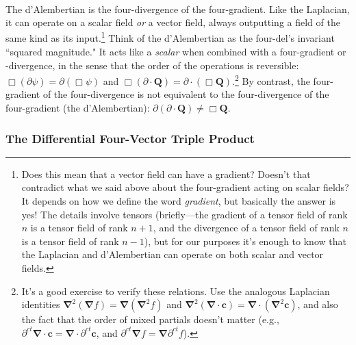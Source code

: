 \documentclass[12pt]{article}
\renewcommand{\vv}[1]{\mathbf{#1}}
\newcommand{\del}{\boldsymbol{\nabla}}
\begin{document}
\begin{itemize}
{\begin{equation*}
\begin{split}
\end{split}
\end{equation*}
The d'Alembertian is the four-divergence of the four-gradient. Like the Laplacian, it can operate on a scalar field \emph{or} a vector field, always outputting a field of the same kind as its input.\footnote{\label{fn:gd}Does this mean that a vector field can have a gradient? Doesn't that contradict what we said above about the four-gradient acting on scalar fields? It depends on how we define the word \emph{gradient}, but basically the answer is yes! The details involve tensors (briefly---the gradient of a tensor field of rank $n$ is a tensor field of rank $n + 1$, and the divergence of a tensor field of rank $n$ is a tensor field of rank $n - 1$), but for our purposes it's enough to know that the Laplacian and d'Alembertian can operate on both scalar and vector fields.} Think of the d'Alembertian as the four-del's invariant ``squared magnitude." It acts like a \emph{scalar} when combined with a four-gradient or -divergence, in the sense that the order of the operations is reversible: $\Box (\partialup \psi) = \partialup (\Box \psi)$ and $\Box (\partialup \cdot \vv Q) = \partialup \cdot (\Box \vv Q)$.\footnote{It's a good exercise to verify these relations. Use the analogous Laplacian identities $\del^2 (\del f) = \del (\del^2 f)$ and $\del^2 (\del \cdot \vv c) = \del \cdot (\del^2 \vv c)$, and also the fact that the order of mixed partials doesn't matter (e.g., $\partial^{ct} \del \cdot \vv c = \del \cdot \partial^{ct} \vv c$, and $\partial^{ct} \del f = \del \partial^{ct} f$).} By contrast, the four-gradient of the four-divergence is not equivalent to the four-divergence of the four-gradient (the d'Alembertian): $\partialup (\partialup \cdot \vv Q) \neq \Box \vv Q$.}
\end{itemize}


\subsubsection{The Differential Four-Vector Triple Product}\label{sssec:tp}
\end{document}
